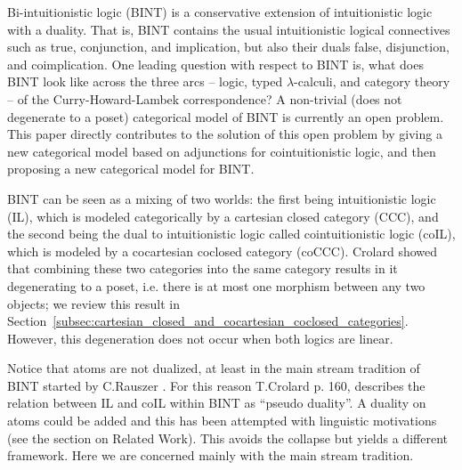 Bi-intuitionistic logic (BINT) is a conservative extension of
intuitionistic logic with a duality.  That is, BINT contains the
usual intuitionistic logical connectives such as true, conjunction,
and implication, but also their duals false, disjunction, and
coimplication.  One leading question with respect to BINT is, what does
BINT look like across the three arcs -- logic, typed
$\lambda$-calculi, and category theory -- of the Curry-Howard-Lambek
correspondence?  A non-trivial (does not degenerate to a poset)
categorical model of BINT is currently an open problem.  This paper
directly contributes to the solution of this open problem by giving a
new categorical model based on adjunctions for cointuitionistic logic,
and then proposing a new categorical model for BINT.  

BINT can be seen as a mixing of two worlds: the first being
intuitionistic logic (IL), which is modeled categorically by a
cartesian closed category (CCC), and the second being the dual to
intuitionistic logic called cointuitionistic logic (coIL), which is
modeled by a cocartesian coclosed category (coCCC).  Crolard
\cite{Crolard:2001} showed that combining these two categories into
the same category results in it degenerating to a poset, i.e.
there is at most one morphism between any two objects; we review this
result in
Section~\ref{subsec:cartesian_closed_and_cocartesian_coclosed_categories}.
However, this degeneration does not occur when both logics are linear.

Notice that atoms are not dualized, at least  in the main stream tradition of BINT
started by C.Rauszer \cite{Rauszer:1974, Rauszer:1980}. For this reason
T.Crolard \cite{Crolard:2001} p. 160, describes the relation between IL and coIL
within BINT as ``pseudo duality''. A duality on atoms could be added 
and this has been attempted with linguistic motivations \cite{Bellin:2014} 
(see the section on Related Work).
This avoids the collapse but yields a different framework.
Here we are concerned mainly with the main stream tradition.

